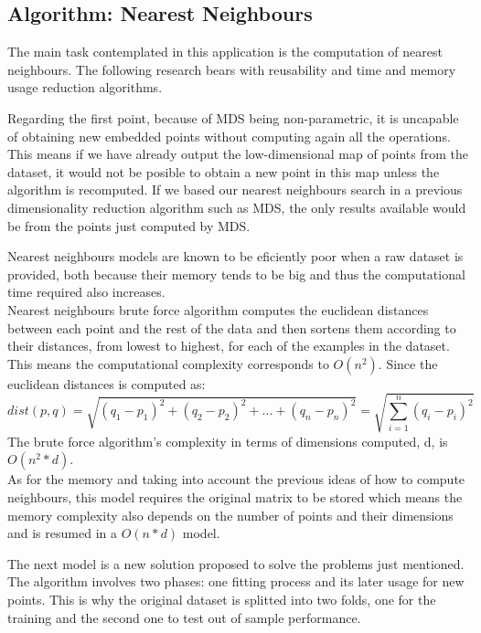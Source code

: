 \documentclass[a4paper,11pt,spanish]{report}
\begin{document}
\subsection{Algorithm: Nearest Neighbours}
\label{ssec:nneigh}

The main task contemplated in this application is the computation of nearest neighbours. The following research bears with reusability and time and memory usage reduction algorithms.

Regarding the first point, because of MDS being non-parametric, it is uncapable of obtaining new embedded points without computing again all the operations. This means if we have already output the low-dimensional map of points from the dataset, it would not be posible to obtain a new point in this map unless the algorithm is recomputed. If we based our nearest neighbours search in a previous dimensionality reduction algorithm such as MDS, the only results available would be from the points just computed by MDS.

Nearest neighbours models are known to be eficiently poor when a raw dataset is provided, both because their memory tends to be big and thus the computational time required also increases.\\
Nearest neighbours brute force algorithm computes the euclidean distances between each point and the rest of the data and then sortens them according to their distances, from lowest to highest, for each of the examples in the dataset. This means the computational complexity corresponds to $O(n^{2})$. Since the euclidean distances is computed as:
$$ dist(p,q) = \sqrt{(q_{1}-p_{1})^{2}+(q_{2}-p_{2})^{2}+ ... + (q_{n}-p_{n})^{2}} = \sqrt{\sum_{i=1}^{n} (q_{i}-p_{i})^{2}}$$
The brute force algorithm's complexity in terms of dimensions computed, d, is $O(n^{2}*d)$.\\
As for the memory and taking into account the previous ideas of how to compute neighbours, this model requires the original matrix to be stored which means the memory complexity also depends on the number of points and their dimensions and is resumed in a $O(n*d)$ model.

The next model is a new solution proposed to solve the problems just mentioned.\\
The algorithm involves two phases: one fitting process and its later usage for new points. This is why the original dataset is splitted into two folds, one for the training and the second one to test out of sample performance.
\end{document}
